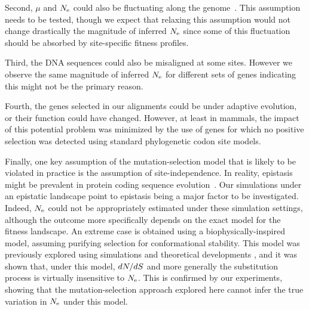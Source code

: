 \documentclass{MBE}
\begin{document}
	Second, $\mu$ and $N_{\text{e}}$ could also be fluctuating along the genome~\citep{Gossmann2011,Ellegren2003,Eyre-Walker2014}.
	This assumption needs to be tested, though we expect that relaxing this assumption would not change drastically the magnitude of inferred $N_{\text{e}}$ since some of this fluctuation should be absorbed by site-specific fitness profiles.

	Third, the {DNA} sequences could also be misaligned at some sites.
	However we observe the same magnitude of inferred $N_{\text{e}}$ for different sets of genes indicating this might not be the primary reason.

	Fourth, the genes selected in our alignments could be under adaptive evolution, or their function could have changed.
	However, at least in mammals, the impact of this potential problem was minimized by the use of genes for which no positive selection was detected using standard phylogenetic {codon} site models.

	Finally, one key assumption of the mutation-selection model that is likely to be violated in practice is the assumption of site-independence.
	In reality, epistasis might be prevalent in protein coding sequence evolution~\citep{Pollock2014,Shah2015}.
	Our simulations under an epistatic landscape point to epistasis being a major factor to be investigated.
	Indeed, $N_{\text{e}}$ could not be appropriately estimated under these simulation settings, although the outcome more specifically depends on the exact model for the fitness landscape.
	An extreme case is obtained using a biophysically-inspired model, assuming purifying selection for conformational stability.
	This model was previously explored using simulations and theoretical developments \citet{Goldstein2013}, and it was shown that, under this model, $dN/dS$ and more generally the {substitution} process is virtually insensitive to $N_{\text{e}}$.
	This is confirmed by our experiments, showing that the mutation-selection approach explored here cannot infer the true variation in $N_{\text{e}}$ under this model.
\end{document}

